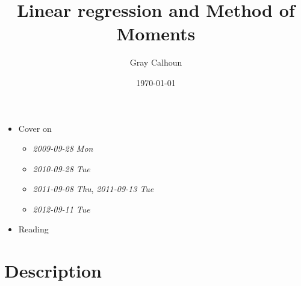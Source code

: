 \documentclass[11pt]{article}
\title{Linear regression and Method of Moments}
\author{Gray Calhoun}
\date{\today}
\begin{document}
\maketitle

\setcounter{tocdepth}{2}
\tableofcontents
\vspace*{1cm}
\begin{itemize}
\item Cover on
\begin{itemize}
\item \textit{2009-09-28 Mon}
\item \textit{2010-09-28 Tue}
\item \textit{2011-09-08 Thu}, \textit{2011-09-13 Tue}
\item \textit{2012-09-11 Tue}
\end{itemize}
\item Reading
\end{itemize}
\section{Description}
\label{sec-1}
\end{document}
